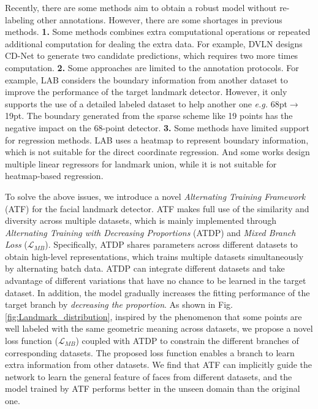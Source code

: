 \documentclass[journal,transmag]{IEEEtran}
\begin{document}
Recently, there are some methods\cite{smith2014collaborative,wu2017leveraging,zhang2015leveraging,LABWFLW,zhu2014transferring} aim to obtain a robust model without re-labeling other annotations.
However, there are some shortages in previous methods. 
{\bf 1.} Some methods \cite{smith2014collaborative,wu2017leveraging,zhang2015leveraging} combines extra computational operations or repeated additional computation for dealing the extra data.
For example, DVLN \cite{wu2017leveraging} designs CD-Net to generate two candidate predictions, which requires two more times computation.
{\bf 2.} Some approaches are limited to the annotation protocols.
For example, LAB \cite{LABWFLW} considers the boundary information from another dataset to improve the performance of the target landmark detector.
However, it only supports the use of a detailed labeled dataset to help another one \emph{e.g.} 68pt$\rightarrow$19pt.
The boundary generated from the sparse scheme like 19 points\cite{AFLW} has the negative impact on the 68-point\cite{300W} detector.
{\bf 3.} Some methods have limited support for regression methods.
LAB uses a heatmap to represent boundary information, which is not suitable for the direct coordinate regression.
And some works \cite{zhu2014transferring} design multiple linear regressors for landmark union, while it is not suitable for heatmap-based regression.


To solve the above issues, we introduce a novel \emph{Alternating Training Framework} (ATF) for the facial landmark detector.
ATF makes full use of the similarity and diversity across multiple datasets, which is mainly implemented through \emph{Alternating Training with Decreasing Proportions} (ATDP) and \emph{Mixed Branch Loss} ($\mathcal{L}_{MB}$).
Specifically, ATDP shares parameters across different datasets to obtain high-level representations, which trains multiple datasets simultaneously by alternating batch data.
ATDP can integrate different datasets and take advantage of different variations that have no chance to be learned in the target dataset.
In addition, the model gradually increases the fitting performance of the target branch by \emph{decreasing the proportion}.
As shown in Fig.\ref{fig:Landmark_distribution}, inspired by the phenomenon \cite{zhu2014transferring} that some points are well labeled with the same geometric meaning across datasets,
we propose a novel loss function ($\mathcal{L}_{MB}$) coupled with ATDP to constrain the different branches of corresponding datasets.
The proposed loss function enables a branch to learn extra information from other datasets.
We find that ATF can implicitly guide the network to learn the general feature of faces from different datasets, 
and the model trained by ATF performs better in the unseen domain than the original one.
\end{document}
